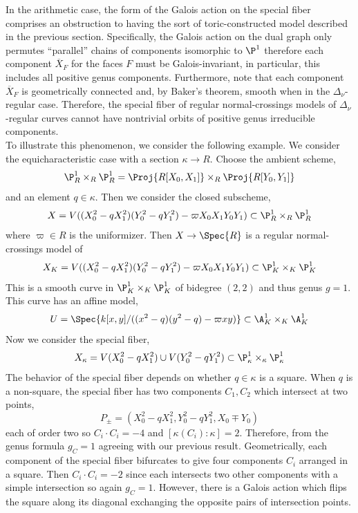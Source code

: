 In the arithmetic case, the form of the Galois action on the special fiber comprises an obstruction to having the sort of toric-constructed model described in the previous section. Specifically, the Galois action on the dual graph only permutes ``parallel'' chains of components isomorphic to $\P^1$ therefore each component $\overline{X}_F$ for the faces $F$ must be Galois-invariant, in particular, this includes all positive genus components. Furthermore, note that each component $\overline{X}_F$ is geometrically connected and, by Baker's theorem, smooth when in the $\Delta_\nu$-regular case. Therefore, the special fiber of regular normal-crossings models of $\Delta_\nu$-regular curves cannot have nontrivial orbits of positive genus irreducible components.  
\bigskip\\
To illustrate this phenomenon, we consider the following example. We consider the equicharacteristic case with a section $\kappa \to R$. Choose the ambient scheme,
\[ \P^1_R \times_R \P^1_R = \Proj{R[X_0, X_1]} \times_R \Proj{R[Y_0, Y_1]} \]
and an element $q \in \kappa$. Then we consider the closed subscheme,
\[ X = V((X_0^2 - q X_1^2)(Y_0^2 - q Y_1^2) - \varpi X_0 X_1 Y_0 Y_1) \subset \P^1_R \times_R \P^1_R \] 
where $\varpi \in R$ is the uniformizer. Then $X \to \Spec{R}$ is a regular normal-crossings model of
\[ X_K = V((X_0^2 - q X_1^2)(Y_0^2 - q Y_1^2) - \varpi X_0 X_1 Y_0 Y_1) \subset \P^1_K \times_K \P^1_K \]
This is a smooth curve in $\P^1_K \times_K \P^1_K$ of bidegree $(2, 2)$ and thus genus $g = 1$.
This curve has an affine model,
\[ U = \Spec{k[x, y]/((x^2 - q)(y^2 - q) - \varpi xy)} \subset \A^1_K \times_K \A^1_K \]
Now we consider the special fiber,
\[ X_\kappa = V(X_0^2 - q X_1^2) \cup V(Y_0^2 - q Y_1^2) \subset \P^1_\kappa \times_\kappa \P^1_\kappa \]
The behavior of the special fiber depends on whether $q \in \kappa$ is a square. When $q$ is a non-square, the special fiber has two components $C_1, C_2$ which intersect at two points,
\[ P_{\pm} = (X_0^2 - q X_1^2, Y_0^2 - q Y_1^2, X_0 \mp Y_0) \]
each of order two so $C_i \cdot C_i = -4$ and $[\kappa(C_i) : \kappa] = 2$. Therefore, from the genus formula $g_C = 1$ agreeing with our previous result. Geometrically, each component of the special fiber bifurcates to give four components $C_i$ arranged in a square. Then $C_i \cdot C_i = -2$ since each intersects two other components with a simple intersection so again $g_C = 1$. However, there is a Galois action which flips the square along its diagonal exchanging the opposite pairs of intersection points.
